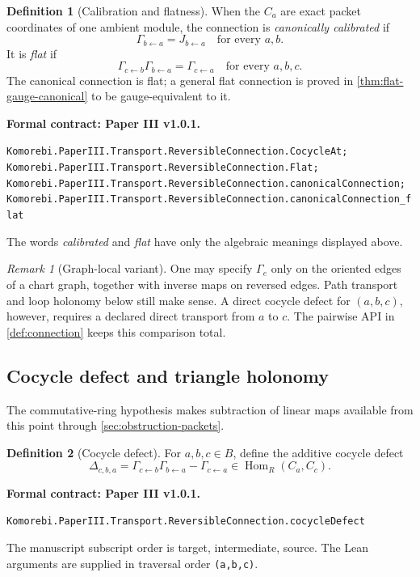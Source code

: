 \documentclass[11pt,a4paper]{article}
\theoremstyle{plain}
\theoremstyle{definition}
\newtheorem{definition}[definition]{Definition}
\theoremstyle{remark}
\newtheorem{remark}[remark]{Remark}
\newcommand{\Hom}{\operatorname{Hom}}
\newcommand{\leanname}[1]{\nolinkurl{#1}}
\newcommand{\statusleanthree}[1]{\par\smallskip\noindent\begin{minipage}{\linewidth}{\color{leanblue}\textbf{Formal contract: Paper III v1.0.1.}}\par\begingroup\small\raggedright\leanname{#1}\par\endgroup\end{minipage}\par\smallskip}
\begin{document}
\begin{definition}[Calibration and flatness]
\label{def:calibration-flatness}
When the $C_a$ are exact packet coordinates of one ambient module, the
connection is \emph{canonically calibrated} if
\[
\Gamma_{b\leftarrow a}=J_{b\leftarrow a}
\quad\text{for every }a,b.
\]
It is \emph{flat} if
\[
\Gamma_{c\leftarrow b}\Gamma_{b\leftarrow a}
=
\Gamma_{c\leftarrow a}
\quad\text{for every }a,b,c.
\]
The canonical connection is flat; a general flat connection is proved in
\cref{thm:flat-gauge-canonical} to be gauge-equivalent to it.
\end{definition}
\statusleanthree{Komorebi.PaperIII.Transport.ReversibleConnection.CocycleAt; Komorebi.PaperIII.Transport.ReversibleConnection.Flat; Komorebi.PaperIII.Transport.ReversibleConnection.canonicalConnection; Komorebi.PaperIII.Transport.ReversibleConnection.canonicalConnection_flat}

The words \emph{calibrated} and \emph{flat} have only the algebraic meanings
displayed above.

\begin{remark}[Graph-local variant]
One may specify $\Gamma_e$ only on the oriented edges of a chart graph,
together with inverse maps on reversed edges.  Path transport and loop
holonomy below still make sense.  A direct cocycle defect for $(a,b,c)$,
however, requires a declared direct transport from $a$ to $c$.  The pairwise
API in \cref{def:connection} keeps this comparison total.
\end{remark}

\subsection{Cocycle defect and triangle holonomy}

The commutative-ring hypothesis makes subtraction of linear maps available
from this point through \cref{sec:obstruction-packets}.

\begin{definition}[Cocycle defect]
\label{def:cocycle-defect}
For $a,b,c\in B$, define the additive cocycle defect
\[
\Delta_{c,b,a}
=
\Gamma_{c\leftarrow b}\Gamma_{b\leftarrow a}
-\Gamma_{c\leftarrow a}
\in\Hom_R(C_a,C_c).
\]
\end{definition}
\statusleanthree{Komorebi.PaperIII.Transport.ReversibleConnection.cocycleDefect}

The manuscript subscript order is target, intermediate, source.  The Lean
arguments are supplied in traversal order \leanname{(a,b,c)}.
\end{document}
